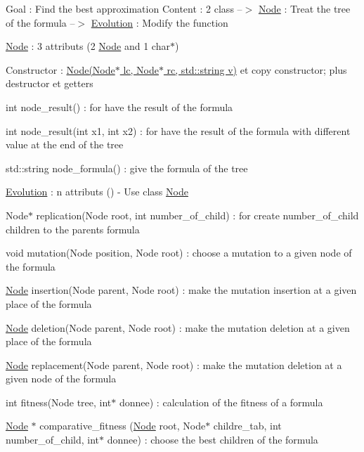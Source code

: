 Goal \+: Find the best approximation Content \+: 2 class --$>$ \hyperlink{classNode}{Node} \+: Treat the tree of the formula --$>$ \hyperlink{classEvolution}{Evolution} \+: Modify the function


\begin{DoxyItemize}
\item \hyperlink{classNode}{Node} \+: 3 attributs (2 \hyperlink{classNode}{Node} and 1 char$\ast$)
\begin{DoxyItemize}
\item Constructor \+: \hyperlink{classNode}{Node(\+Node$\ast$ lc, Node$\ast$ rc, std\+::string v)} et copy constructor; plus destructor et getters
\item int node\+\_\+result() \+: for have the result of the formula
\item int node\+\_\+result(int x1, int x2) \+: for have the result of the formula with different value at the end of the tree
\item std\+::string node\+\_\+formula() \+: give the formula of the tree
\end{DoxyItemize}
\item \hyperlink{classEvolution}{Evolution} \+: n attributs () -\/ Use class \hyperlink{classNode}{Node}
\begin{DoxyItemize}
\item Node$\ast$ replication(\+Node root, int number\+\_\+of\+\_\+child) \+: for create number\+\_\+of\+\_\+child children to the parent\textquotesingle{}s formula
\item void mutation(\+Node position, Node root) \+: choose a mutation to a given node of the formula
\item \hyperlink{classNode}{Node} insertion(\+Node parent, Node root) \+: make the mutation \textquotesingle{}insertion\textquotesingle{} at a given place of the formula
\item \hyperlink{classNode}{Node} deletion(\+Node parent, Node root) \+: make the mutation \textquotesingle{}deletion\textquotesingle{} at a given place of the formula
\item \hyperlink{classNode}{Node} replacement(\+Node parent, Node root) \+: make the mutation \textquotesingle{}deletion\textquotesingle{} at a given node of the formula
\item int fitness(\+Node tree, int$\ast$ donnee) \+: calculation of the fitness of a formula
\item \hyperlink{classNode}{Node} $\ast$ comparative\+\_\+fitness (\hyperlink{classNode}{Node} root, Node$\ast$ childre\+\_\+tab, int number\+\_\+of\+\_\+child, int$\ast$ donnee) \+: choose the best children of the formula 
\end{DoxyItemize}
\end{DoxyItemize}